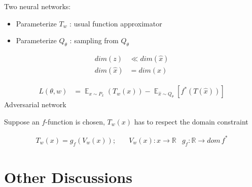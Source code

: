 \documentclass[11pt]{article}
\DeclareMathOperator*{\E}{\mathbb{E}}
\begin{document}
Two neural networks:
\begin{itemize}
\item Parameterize $T_w$ : usual function approximator
\item Parameterize $Q_{\theta}$ : sampling from $Q_{\theta}$
\end{itemize}

\begin{minipage}{0.70\textwidth}
  \begin{align*}
    dim(z) &\ll dim(\hat{x}) \\
    dim(\hat{x}) &= dim(x)
  \end{align*}
\end{minipage}
\begin{minipage}{0.30\textwidth}
		\centering
      \label{fig:generator_nn}
\end{minipage}

\begin{align*}
  L(\theta, w) &= \E_{x \sim P_x}(T_w(x)) - \E_{\hat{x} \sim Q_{\theta}} \left[ f^{*} (T(\hat{x})) \right]
\end{align*}
Adversarial network

Suppose an $f$-function is chosen,
$T_w(x)$ has to respect the domain constraint

\begin{align*}
  T_w(x) = g_f(V_w(x));\quad &V_w(x) : x \rightarrow \mathbb{R}
  &g_f: \mathbb{R} \rightarrow dom\,f^{*}
\end{align*}




\clearpage

\section{Other Discussions}
\label{sec:other-disc}
\end{document}
